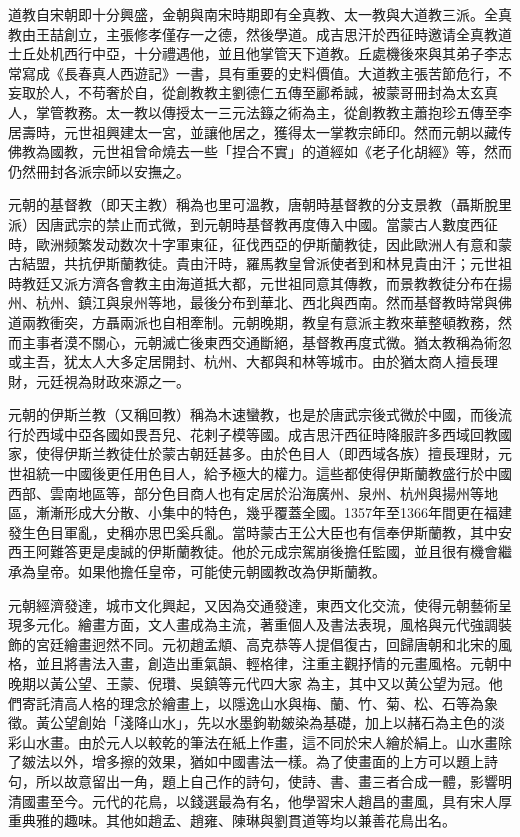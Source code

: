 道教自宋朝即十分興盛，金朝與南宋時期即有全真教、太一教與大道教三派。全真教由王喆創立，主張修孝僅存一之德，然後學道。成吉思汗於西征時邀请全真教道士丘处机西行中亞，十分禮遇他，並且他掌管天下道教。丘處機後來與其弟子李志常寫成《長春真人西遊記》一書，具有重要的史料價值。大道教主張苦節危行，不妄取於人，不苟奢於自，從創教教主劉德仁五傳至酈希誠，被蒙哥冊封為太玄真人，掌管教務。太一教以傳授太一三元法籙之術為主，從創教教主蕭抱珍五傳至李居壽時，元世祖興建太一宮，並讓他居之，獲得太一掌教宗師印。然而元朝以藏传佛教為國教，元世祖曾命燒去一些「捏合不實」的道經如《老子化胡經》等，然而仍然冊封各派宗師以安撫之。

元朝的基督教（即天主教）稱為也里可溫教，唐朝時基督教的分支景教（聶斯脫里派）因唐武宗的禁止而式微，到元朝時基督教再度傳入中國。當蒙古人數度西征時，歐洲频繁发动数次十字軍東征，征伐西亞的伊斯蘭教徒，因此歐洲人有意和蒙古結盟，共抗伊斯蘭教徒。貴由汗時，羅馬教皇曾派使者到和林見貴由汗；元世祖時教廷又派方濟各會教主由海道抵大都，元世祖同意其傳教，而景教教徒分布在揚州、杭州、鎮江與泉州等地，最後分布到華北、西北與西南。然而基督教時常與佛道兩教衝突，方聶兩派也自相牽制。元朝晚期，教皇有意派主教來華整頓教務，然而主事者漠不關心，元朝滅亡後東西交通斷絕，基督教再度式微。猶太教稱為術忽或主吾，犹太人大多定居開封、杭州、大都與和林等城市。由於猶太商人擅長理財，元廷視為財政來源之一。

元朝的伊斯兰教（又稱回教）稱為木速蠻教，也是於唐武宗後式微於中國，而後流行於西域中亞各國如畏吾兒、花剌子模等國。成吉思汗西征時降服許多西域回教國家，使得伊斯兰教徒仕於蒙古朝廷甚多。由於色目人（即西域各族）擅長理財，元世祖統一中國後更任用色目人，給予極大的權力。這些都使得伊斯蘭教盛行於中國西部、雲南地區等，部分色目商人也有定居於沿海廣州、泉州、杭州與揚州等地區，漸漸形成大分散、小集中的特色，幾乎覆蓋全國。1357年至1366年間更在福建發生色目軍亂，史稱亦思巴奚兵亂。當時蒙古王公大臣也有信奉伊斯蘭教，其中安西王阿難答更是虔誠的伊斯蘭教徒。他於元成宗駕崩後擔任監國，並且很有機會繼承為皇帝。如果他擔任皇帝，可能使元朝國教改為伊斯蘭教。

元朝經濟發達，城市文化興起，又因為交通發達，東西文化交流，使得元朝藝術呈現多元化。繪畫方面，文人畫成為主流，著重個人及書法表現，風格與元代強調裝飾的宮廷繪畫迥然不同。元初趙孟頫、高克恭等人提倡復古，回歸唐朝和北宋的風格，並且將書法入畫，創造出重氣韻、輕格律，注重主觀抒情的元畫風格。元朝中晚期以黃公望、王蒙、倪瓚、吳鎮等元代四大家 為主，其中又以黄公望为冠。他們寄託清高人格的理念於繪畫上，以隱逸山水與梅、蘭、竹、菊、松、石等為象徵。黃公望創始「淺降山水」，先以水墨鉤勒皴染為基礎，加上以赭石為主色的淡彩山水畫。由於元人以較乾的筆法在紙上作畫，這不同於宋人繪於絹上。山水畫除了皴法以外，增多擦的效果，猶如中國書法一樣。為了使畫面的上方可以題上詩句，所以故意留出一角，題上自己作的詩句，使詩、書、畫三者合成一體，影響明清國畫至今。元代的花鳥，以錢選最為有名，他學習宋人趙昌的畫風，具有宋人厚重典雅的趣味。其他如趙孟、趙雍、陳琳與劉貫道等均以兼善花鳥出名。

